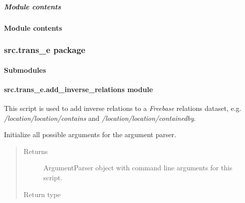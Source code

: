\documentclass[letterpaper,10pt,english]{sphinxmanual}
\begin{document}
\subparagraph{Module contents}
\label{src.prep.relations:module-src.prep.relations}\label{src.prep.relations:module-contents}

\paragraph{Module contents}
\label{src.prep:module-contents}\label{src.prep:module-src.prep}

\subsubsection{src.trans\_e package}
\label{src.trans_e:src-trans-e-package}\label{src.trans_e::doc}

\paragraph{Submodules}
\label{src.trans_e:submodules}

\paragraph{src.trans\_e.add\_inverse\_relations module}
\label{src.trans_e:module-src.trans_e.add_inverse_relations}\label{src.trans_e:src-trans-e-add-inverse-relations-module}
This script is used to add inverse relations to a \emph{Freebase} relations dataset, e.g.
\emph{/location/location/contains} and \emph{/location/location/containedby}.

\begin{fulllineitems}
\label{src.trans_e:src.trans_e.add_inverse_relations.add_inverse_relations}
\end{fulllineitems}


\begin{fulllineitems}
\label{src.trans_e:src.trans_e.add_inverse_relations.init_argparse}
Initialize all possible arguments for the argument parser.
\begin{quote}\begin{description}
\item[{Returns}] \leavevmode
ArgumentParser object with command line arguments for this script.

\item[{Return type}] \leavevmode
{}

\end{description}\end{quote}

\end{fulllineitems}
\end{document}
